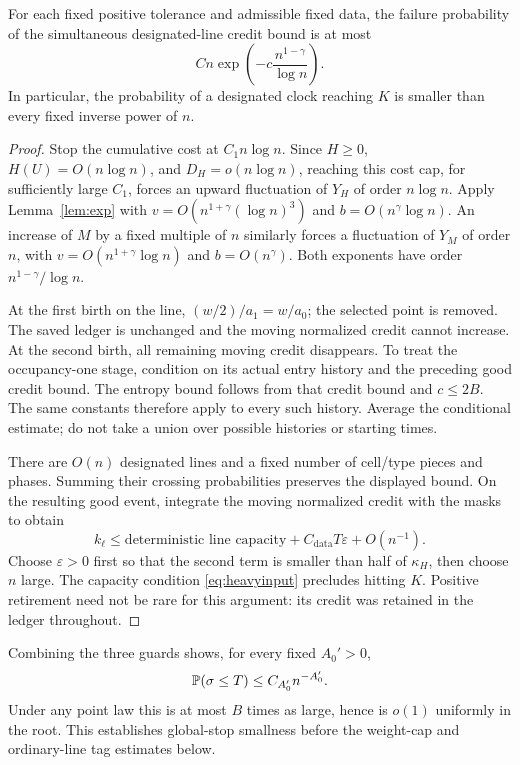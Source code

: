 \begin{proposition}\label{prop:clock}
For each fixed positive tolerance and admissible fixed data, the
failure probability of the simultaneous designated-line credit
bound is at most
\[
 Cn\exp\left(-c\frac{n^{1-\gamma}}{\log n}\right).
\]
In particular, the probability of a designated clock reaching \(K\)
is smaller than every fixed inverse power of \(n\).
\end{proposition}
\begin{proof}
Stop the cumulative cost at \(C_1n\log n\). Since \(H\ge0\),
\(H(U)=O(n\log n)\), and \(D_H=o(n\log n)\), reaching this cost
cap, for sufficiently large \(C_1\), forces an upward fluctuation
of \(Y_H\) of order \(n\log n\). Apply Lemma~\ref{lem:exp} with
\(v=O(n^{1+\gamma}(\log n)^3)\) and
\(b=O(n^\gamma\log n)\). An increase of \(M\) by a fixed multiple
of \(n\) similarly forces a fluctuation of \(Y_M\) of order \(n\),
with \(v=O(n^{1+\gamma}\log n)\) and \(b=O(n^\gamma)\).
Both exponents have order \(n^{1-\gamma}/\log n\).

At the first birth on the line,
\((w/2)/a_1=w/a_0\); the selected point is removed. The saved ledger
is unchanged and the moving normalized credit cannot increase.
At the second birth, all remaining moving credit disappears. To
treat the occupancy-one stage, condition on its actual entry history
and the preceding good credit bound. The entropy bound follows
from that credit bound and \(c\le2B\). The same constants therefore
apply to every such history. Average the conditional estimate; do
not take a union over possible histories or starting times.

There are \(O(n)\) designated lines and a fixed number of cell/type
pieces and phases. Summing their crossing probabilities preserves
the displayed bound. On the resulting good event, integrate the
moving normalized credit with the masks to obtain
\[
 k_\ell\le\text{deterministic line capacity}
             +C_{\mathrm{data}}T\varepsilon+O(n^{-1}).
\]
Choose \(\varepsilon>0\) first so that the second term is smaller
than half of \(\kappa_H\), then choose \(n\) large. The capacity
condition \eqref{eq:heavyinput} precludes hitting \(K\).
Positive retirement need not be rare for this argument: its credit
was retained in the ledger throughout.
\end{proof}

Combining the three guards shows, for every fixed \(A_0'>0\),
\begin{equation}\label{eq:globaltail}
 \mathbb P(\sigma\le T)\le C_{A_0'}n^{-A_0'}.
\end{equation}
Under any point law this is at most \(B\) times as large, hence is
\(o(1)\) uniformly in the root. This establishes global-stop smallness
before the weight-cap and ordinary-line tag estimates below.

